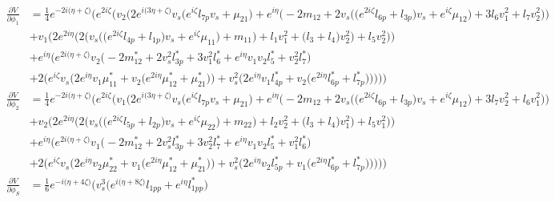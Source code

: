 \begin{align} 
\frac{\partial V}{\partial \phi_1} &= \frac{1}{4} e^{-2 i \Big(\eta +\zeta \Big)} \Big(e^{2 i \zeta } \Big(v_2 \Big(2 e^{i \Big(3 \eta +\zeta \Big)} v_s \Big(e^{i \zeta } l_{7p} v_s  + \mu_{21}\Big) + e^{i \eta } \Big(-2 m_{12}  + 2 v_s \Big(\Big(e^{2 i \zeta } l_{6p}  + l_{3p}\Big)v_s  + e^{i \zeta } \mu_{12} \Big) + 3 l_6 v_{1}^{2}  + l_7 v_{2}^{2} \Big)\Big)\nonumber \\ 
 &+v_1 \Big(2 e^{2 i \eta } \Big(2 \Big(v_s \Big(\Big(e^{2 i \zeta } l_{4p}  + l_{1p}\Big)v_s  + e^{i \zeta } \mu_{11} \Big) + m_{11}\Big) + l_1 v_{1}^{2}  + \Big(l_3 + l_4\Big)v_{2}^{2} \Big) + l_5 v_{2}^{2} \Big)\Big)\nonumber \\ 
 &+e^{i \eta } \Big(e^{2 i \Big(\eta +\zeta \Big)} v_2 \Big(-2 m_{12}^*  + 2 v_{s}^{2} l_{3p}^*  + 3 v_{1}^{2} l_6^*  + e^{i \eta } v_1 v_2 l_5^*  + v_{2}^{2} l_7^* \Big)\nonumber \\ 
 &+2 \Big(e^{i \zeta } v_s \Big(2 e^{i \eta } v_1 \mu_{11}^*  + v_2 \Big(e^{2 i \eta } \mu_{12}^*  + \mu_{21}^*\Big)\Big) + v_{s}^{2} \Big(2 e^{i \eta } v_1 l_{4p}^*  + v_2 \Big(e^{2 i \eta } l_{6p}^*  + l_{7p}^*\Big)\Big)\Big)\Big)\Big)\\ 
\frac{\partial V}{\partial \phi_2} &= \frac{1}{4} e^{-2 i \Big(\eta +\zeta \Big)} \Big(e^{2 i \zeta } \Big(v_1 \Big(2 e^{i \Big(3 \eta +\zeta \Big)} v_s \Big(e^{i \zeta } l_{7p} v_s  + \mu_{21}\Big) + e^{i \eta } \Big(-2 m_{12}  + 2 v_s \Big(\Big(e^{2 i \zeta } l_{6p}  + l_{3p}\Big)v_s  + e^{i \zeta } \mu_{12} \Big) + 3 l_7 v_{2}^{2}  + l_6 v_{1}^{2} \Big)\Big)\nonumber \\ 
 &+v_2 \Big(2 e^{2 i \eta } \Big(2 \Big(v_s \Big(\Big(e^{2 i \zeta } l_{5p}  + l_{2p}\Big)v_s  + e^{i \zeta } \mu_{22} \Big) + m_{22}\Big) + l_2 v_{2}^{2}  + \Big(l_3 + l_4\Big)v_{1}^{2} \Big) + l_5 v_{1}^{2} \Big)\Big)\nonumber \\ 
 &+e^{i \eta } \Big(e^{2 i \Big(\eta +\zeta \Big)} v_1 \Big(-2 m_{12}^*  + 2 v_{s}^{2} l_{3p}^*  + 3 v_{2}^{2} l_7^*  + e^{i \eta } v_1 v_2 l_5^*  + v_{1}^{2} l_6^* \Big)\nonumber \\ 
 &+2 \Big(e^{i \zeta } v_s \Big(2 e^{i \eta } v_2 \mu_{22}^*  + v_1 \Big(e^{2 i \eta } \mu_{12}^*  + \mu_{21}^*\Big)\Big) + v_{s}^{2} \Big(2 e^{i \eta } v_2 l_{5p}^*  + v_1 \Big(e^{2 i \eta } l_{6p}^*  + l_{7p}^*\Big)\Big)\Big)\Big)\Big)\\ 
\frac{\partial V}{\partial \phi_S} &= \frac{1}{6} e^{-i \Big(\eta +4 \zeta \Big)} \Big(v_{s}^{3} \Big(e^{i \Big(\eta +8 \zeta \Big)} l_{1pp}  + e^{i \eta } l_{1pp}^* \Big)\nonumber \\ 

\end{align}
